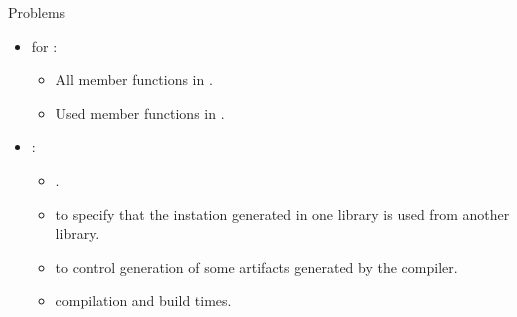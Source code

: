 \begin{frame}[t,fragile]{Problems}
\begin{itemize}
  \item {} for :
    \begin{itemize}
      \item All member functions in .
      \item Used member functions in .
    \end{itemize}

  \item {}:
    \begin{itemize}
      \item {}.
      \item {} to specify that the instation generated
            in one library is used from another library.
      \item {} to control generation of some artifacts
            generated by the compiler.
      \item {} compilation and build times.
    \end{itemize}
\end{itemize}
\end{frame}
